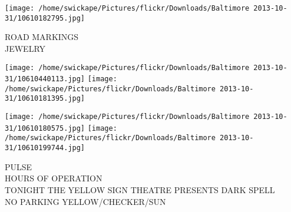\documentclass[10pt,letterpaper]{article}
\begin{document}
\vspace{0.25in}
\texttt{[image: /home/swickape/Pictures/flickr/Downloads/Baltimore 2013-10-31/10610182795.jpg]}

ROAD MARKINGS\\
JEWELRY\\
\pagebreak

\texttt{[image: /home/swickape/Pictures/flickr/Downloads/Baltimore 2013-10-31/10610440113.jpg]}
\texttt{[image: /home/swickape/Pictures/flickr/Downloads/Baltimore 2013-10-31/10610181395.jpg]}

\texttt{[image: /home/swickape/Pictures/flickr/Downloads/Baltimore 2013-10-31/10610180575.jpg]}
\texttt{[image: /home/swickape/Pictures/flickr/Downloads/Baltimore 2013-10-31/10610199744.jpg]}

PULSE\\
HOURS OF OPERATION\\
TONIGHT THE YELLOW SIGN THEATRE PRESENTS DARK SPELL\\
NO PARKING YELLOW/CHECKER/SUN\\
\pagebreak
\end{document}

